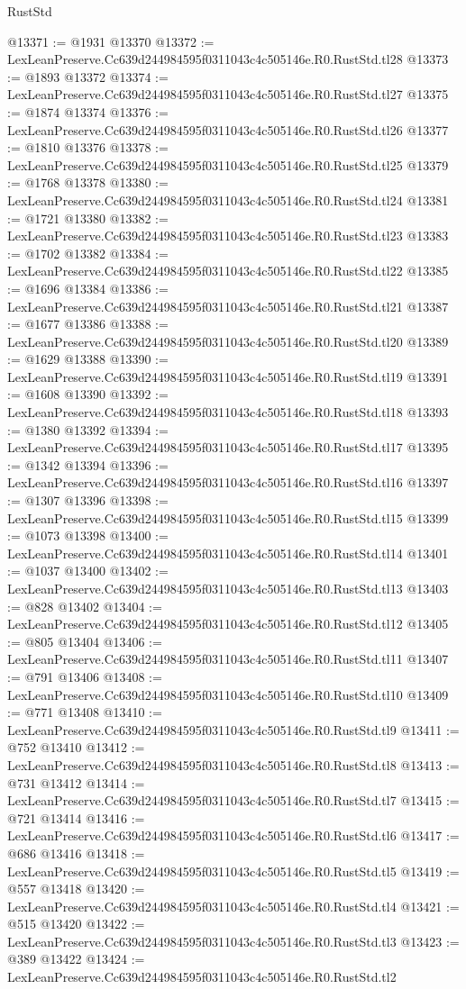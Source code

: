 \begin{lexlean}{RustStd}
\begin{coremodule}
@13371 := @1931 @13370
@13372 := LexLeanPreserve.Cc639d244984595f0311043c4c505146e.R0.RustStd.tl28
@13373 := @1893 @13372
@13374 := LexLeanPreserve.Cc639d244984595f0311043c4c505146e.R0.RustStd.tl27
@13375 := @1874 @13374
@13376 := LexLeanPreserve.Cc639d244984595f0311043c4c505146e.R0.RustStd.tl26
@13377 := @1810 @13376
@13378 := LexLeanPreserve.Cc639d244984595f0311043c4c505146e.R0.RustStd.tl25
@13379 := @1768 @13378
@13380 := LexLeanPreserve.Cc639d244984595f0311043c4c505146e.R0.RustStd.tl24
@13381 := @1721 @13380
@13382 := LexLeanPreserve.Cc639d244984595f0311043c4c505146e.R0.RustStd.tl23
@13383 := @1702 @13382
@13384 := LexLeanPreserve.Cc639d244984595f0311043c4c505146e.R0.RustStd.tl22
@13385 := @1696 @13384
@13386 := LexLeanPreserve.Cc639d244984595f0311043c4c505146e.R0.RustStd.tl21
@13387 := @1677 @13386
@13388 := LexLeanPreserve.Cc639d244984595f0311043c4c505146e.R0.RustStd.tl20
@13389 := @1629 @13388
@13390 := LexLeanPreserve.Cc639d244984595f0311043c4c505146e.R0.RustStd.tl19
@13391 := @1608 @13390
@13392 := LexLeanPreserve.Cc639d244984595f0311043c4c505146e.R0.RustStd.tl18
@13393 := @1380 @13392
@13394 := LexLeanPreserve.Cc639d244984595f0311043c4c505146e.R0.RustStd.tl17
@13395 := @1342 @13394
@13396 := LexLeanPreserve.Cc639d244984595f0311043c4c505146e.R0.RustStd.tl16
@13397 := @1307 @13396
@13398 := LexLeanPreserve.Cc639d244984595f0311043c4c505146e.R0.RustStd.tl15
@13399 := @1073 @13398
@13400 := LexLeanPreserve.Cc639d244984595f0311043c4c505146e.R0.RustStd.tl14
@13401 := @1037 @13400
@13402 := LexLeanPreserve.Cc639d244984595f0311043c4c505146e.R0.RustStd.tl13
@13403 := @828 @13402
@13404 := LexLeanPreserve.Cc639d244984595f0311043c4c505146e.R0.RustStd.tl12
@13405 := @805 @13404
@13406 := LexLeanPreserve.Cc639d244984595f0311043c4c505146e.R0.RustStd.tl11
@13407 := @791 @13406
@13408 := LexLeanPreserve.Cc639d244984595f0311043c4c505146e.R0.RustStd.tl10
@13409 := @771 @13408
@13410 := LexLeanPreserve.Cc639d244984595f0311043c4c505146e.R0.RustStd.tl9
@13411 := @752 @13410
@13412 := LexLeanPreserve.Cc639d244984595f0311043c4c505146e.R0.RustStd.tl8
@13413 := @731 @13412
@13414 := LexLeanPreserve.Cc639d244984595f0311043c4c505146e.R0.RustStd.tl7
@13415 := @721 @13414
@13416 := LexLeanPreserve.Cc639d244984595f0311043c4c505146e.R0.RustStd.tl6
@13417 := @686 @13416
@13418 := LexLeanPreserve.Cc639d244984595f0311043c4c505146e.R0.RustStd.tl5
@13419 := @557 @13418
@13420 := LexLeanPreserve.Cc639d244984595f0311043c4c505146e.R0.RustStd.tl4
@13421 := @515 @13420
@13422 := LexLeanPreserve.Cc639d244984595f0311043c4c505146e.R0.RustStd.tl3
@13423 := @389 @13422
@13424 := LexLeanPreserve.Cc639d244984595f0311043c4c505146e.R0.RustStd.tl2

\end{coremodule}
\end{lexlean}
